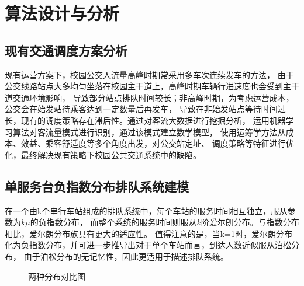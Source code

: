 \section{算法设计与分析}


\subsection{现有交通调度方案分析}
现有运营方案下，校园公交人流量高峰时期常采用多车次连续发车的方法，
由于公交线路站点大多均匀坐落在校园主干道上，高峰时期车辆行进速度也会受到主干道交通环境影响，
导致部分站点排队时间较长；非高峰时期，为考虑运营成本，公交会在始发站待乘客达到一定数量后再发车，
导致在非始发站点等待时间过长，现有的调度策略存在滞后性。通过对客流大数据进行挖掘分析，
运用机器学习算法对客流量模式进行识别，通过该模式建立数学模型，
使用运筹学方法从成本、效益、乘客舒适度等多个角度出发，对公交站定址、
调度策略等特征进行优化，最终解决现有策略下校园公共交通系统中的缺陷。

\subsection{单服务台负指数分布排队系统建模}

在一个由k个串行车站组成的排队系统中，每个车站的服务时间相互独立，服从参数为$k\mu$的负指数分布，
而整个系统的服务时间则服从$k$阶爱尔朗分布。与指数分布相比，爱尔朗分布族具有更大的适应性。
值得注意的是，当k=1时，爱尔朗分布化为负指数分布，并可进一步推导出对于单个车站而言，到达人数近似服从泊松分布，
由于泊松分布的无记忆性\cite{gll}，因此更适用于描述排队系统。
\\
\begin{figure}[htbp!]
    \centering
    \caption{两种分布对比图}
    \label{dis1}
\end{figure}


